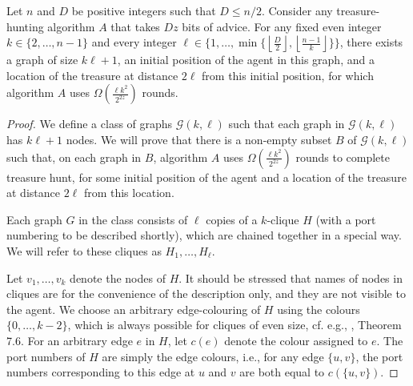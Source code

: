 \documentclass{llncs}
\newcommand{\classletter}{\ensuremath{\mathcal{G}}}
\newcommand{\ourclass}{\ensuremath{\classletter (k,\ell)}}
\begin{document}
\begin{lemma}\label{lowerboundgraph}
Let $n$ and $D$ be positive integers such that $D\leq n/2$.
Consider any treasure-hunting algorithm $A$ that takes $Dz$ bits of advice. For any fixed even integer $k \in \{2,\ldots,n-1\}$ and every integer $\ell \in \{1, \ldots, \min\{\left\lfloor\frac{D}{2}\right\rfloor,\left\lfloor\frac{n-1}{k}\right\rfloor\}\}$, there exists a graph of size $k\ell+1$, an initial position of the agent in this graph,  and a location of the treasure at distance $2\ell$ from this initial position, for which algorithm $A$ uses $\Omega(\frac{\ell k^2}{2^{2z}})$ rounds.
\end{lemma}
\begin{proof}
We define a class of graphs $\ourclass$ such that each graph in $\ourclass$ has $k\ell + 1$ nodes. We will prove that there is a non-empty subset $B$ of $\ourclass$ such that, on each graph in $B$, algorithm $A$ uses $\Omega(\frac{\ell k^2}{2^{2z}})$ rounds to complete treasure hunt, for some initial position of the agent and a location of the 
treasure at distance $2\ell$ from this location. 

Each graph $G$ in the class consists of $\ell$ copies of a $k$-clique $H$ 
(with a port numbering to be described shortly), which are chained together in a special way. We will refer to these cliques as $H_1,\ldots,H_\ell$. 

Let $v_1,\ldots,v_k$ denote the nodes of $H$. It should be stressed that names of nodes in cliques are for the convenience of the description only, and they are not visible to the agent. 
We choose an arbitrary edge-colouring of $H$ using the colours $\{0,\ldots,k-2\}$, which is always possible for cliques of even size, cf. e.g., \cite{Gib}, Theorem 7.6. For an arbitrary edge $e$ in $H$, let $c(e)$ denote the colour assigned to $e$. The port numbers of $H$ are simply the edge colours, i.e., for any edge $\{u,v\}$, the port numbers corresponding to this edge at $u$ and $v$ are both equal to $c(\{u,v\})$. 


\end{proof}
\end{document}

